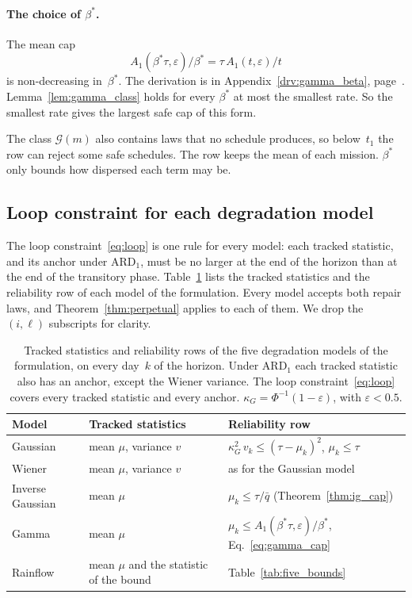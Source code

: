 \documentclass[11pt,a4paper]{article}
\theoremstyle{plain}
\theoremstyle{definition}
\theoremstyle{remark}
\begin{document}
\paragraph{The choice of $\beta^*$.}
The mean cap
\begin{equation}
  A_1(\beta^*\tau, \varepsilon)/\beta^* = \tau\, A_1(t, \varepsilon)/t
\end{equation}
is non-decreasing in~$\beta^*$.
The derivation is in Appendix~\ref{drv:gamma_beta}, page~\pageref{drv:gamma_beta}.
Lemma~\ref{lem:gamma_class} holds for every $\beta^*$ at most the smallest rate.
So the smallest rate gives the largest safe cap of this form.

The class $\mathcal{G}(m)$ also contains laws that no schedule produces, so below~$t_1$ the row can reject some safe schedules.
The row keeps the mean of each mission.
$\beta^*$ only bounds how dispersed each term may be.

\subsection{Loop constraint for each degradation model}
\label{sec:loop_per_model}

The loop constraint~\eqref{eq:loop} is one rule for every model: each tracked statistic, and its anchor under $\text{ARD}_1$, must be no larger at the end of the horizon than at the end of the transitory phase.
Table~\ref{tab:loop_per_model} lists the tracked statistics and the reliability row of each model of the formulation.
Every model accepts both repair laws, and Theorem~\ref{thm:perpetual} applies to each of them.
We drop the $(i,\ell)$ subscripts for clarity.

\begin{table}[htbp]
\centering
\caption{Tracked statistics and reliability rows of the five degradation models of the formulation, on every day~$k$ of the horizon.
Under $\text{ARD}_1$ each tracked statistic also has an anchor, except the Wiener variance.
The loop constraint~\eqref{eq:loop} covers every tracked statistic and every anchor.
$\kappa_G = \Phi^{-1}(1-\varepsilon)$, with $\varepsilon < 0.5$.}
\label{tab:loop_per_model}
\small
\begin{tabular}{@{}lll@{}}
\toprule
\rowcolor{headgrey}
\textbf{Model} & \textbf{Tracked statistics} & \textbf{Reliability row} \\
\midrule
Gaussian         & mean $\mu$, variance $v$ & $\kappa_G^2\, v_k \le (\tau - \mu_k)^2$, \quad $\mu_k \le \tau$ \\
Wiener           & mean $\mu$, variance $v$ & as for the Gaussian model \\
Inverse Gaussian & mean $\mu$ & $\mu_k \le \tau/\bar q$ (Theorem~\ref{thm:ig_cap}) \\
Gamma            & mean $\mu$ & $\mu_k \le A_1(\beta^*\tau, \varepsilon)/\beta^*$, Eq.~\eqref{eq:gamma_cap} \\
Rainflow         & mean $\mu$ and the statistic of the bound & Table~\ref{tab:five_bounds} \\
\bottomrule
\end{tabular}
\end{table}
\end{document}
